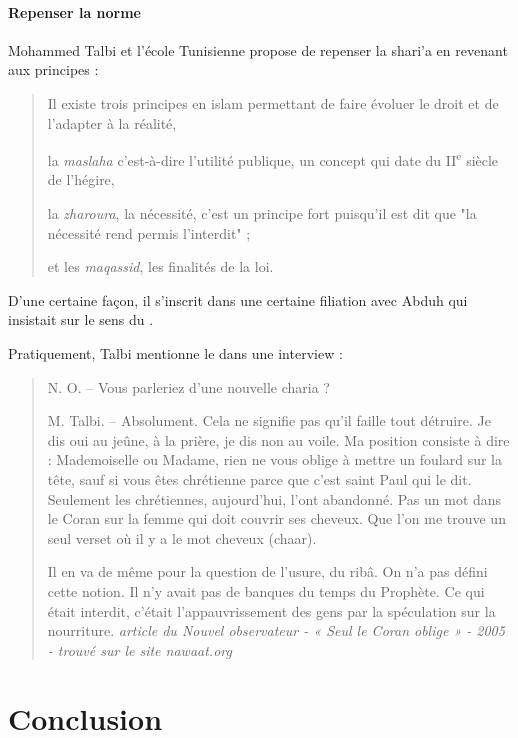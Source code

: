 \paragraph{Repenser la norme} Mohammed Talbi et l'école Tunisienne propose de repenser la shari'a en revenant aux principes :
\begin{quote}
    Il existe
trois principes en islam permettant de faire évoluer le droit et de
l'adapter
à la réalité, 

la \emph{maslaha} c'est-à-dire l'utilité publique, un
concept qui date du II\textsuperscript{e} siècle de l'hégire, 

la
\emph{zharoura}, la nécessité, c'est un principe fort puisqu'il est dit
que "la nécessité rend permis l'interdit" ; 

et les \emph{maqassid}, les
finalités de la loi. 
\end{quote}
D'une certaine façon, il s'inscrit dans une certaine filiation avec Abduh qui insistait sur le sens du \riba.

Pratiquement, Talbi mentionne le \riba dans une interview : 
\begin{quote}
  N. O. – Vous parleriez d’une nouvelle charia ?

M. Talbi. – Absolument. Cela ne signifie pas qu’il faille tout détruire. Je dis oui au jeûne, à la prière, je dis non au voile. Ma position consiste à dire : Mademoiselle ou Madame, rien ne vous oblige à mettre un foulard sur la tête, sauf si vous êtes chrétienne parce que c’est saint Paul qui le dit. Seulement les chrétiennes, aujourd’hui, l’ont abandonné. Pas un mot dans le Coran sur la femme qui doit couvrir ses cheveux. Que l’on me trouve un seul verset où il y a le mot cheveux (chaar).

Il en va de même pour la question de l’usure, du ribâ. On n’a pas défini cette notion. Il n’y avait pas de banques du temps du Prophète. Ce qui était interdit, c’était l’appauvrissement des gens par la spéculation sur la nourriture. \textit{article du Nouvel observateur - « Seul le Coran oblige » - 2005 - trouvé sur le site \textit{nawaat.org} }  
\end{quote}
 
 

\section{Conclusion}



